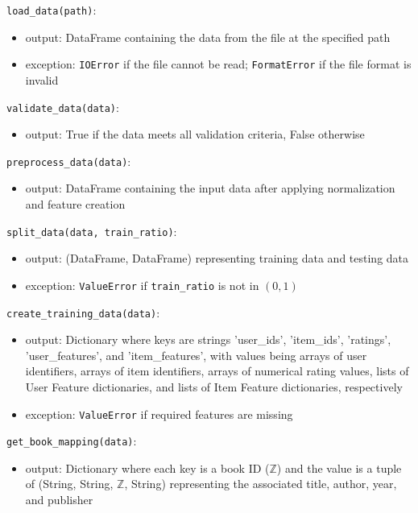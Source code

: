 \documentclass[12pt, titlepage]{article}
\begin{document}
\noindent \texttt{load\_data(path)}:
\begin{itemize}
\item output: DataFrame containing the data from the file at the specified path
\item exception: \texttt{IOError} if the file cannot be read; \texttt{FormatError} if the file format is invalid
\end{itemize}

\noindent \texttt{validate\_data(data)}:
\begin{itemize}
\item output: True if the data meets all validation criteria, False otherwise
\end{itemize}

\noindent \texttt{preprocess\_data(data)}:
\begin{itemize}
\item output: DataFrame containing the input data after applying normalization and feature creation
\end{itemize}

\noindent \texttt{split\_data(data, train\_ratio)}:
\begin{itemize}
\item output: (DataFrame, DataFrame) representing training data and testing data
\item exception: \texttt{ValueError} if \texttt{train\_ratio} is not in $(0,1)$
\end{itemize}

\noindent \texttt{create\_training\_data(data)}:
\begin{itemize}
\item output: Dictionary where keys are strings 'user\_ids', 'item\_ids', 'ratings', 'user\_features', and 'item\_features', with values being arrays of user identifiers, arrays of item identifiers, arrays of numerical rating values, lists of User Feature dictionaries, and lists of Item Feature dictionaries, respectively
\item exception: \texttt{ValueError} if required features are missing
\end{itemize}

\noindent \texttt{get\_book\_mapping(data)}:
\begin{itemize}
\item output: Dictionary where each key is a book ID ($\mathbb{Z}$) and the value is a tuple of (String, String, $\mathbb{Z}$, String) representing the associated title, author, year, and publisher
\end{itemize}
\end{document}
